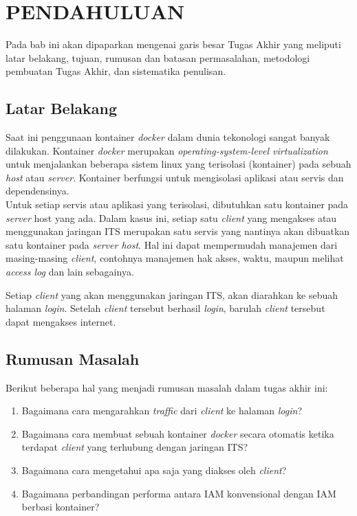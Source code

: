 \chapter{PENDAHULUAN}
  Pada bab ini akan dipaparkan mengenai garis besar Tugas Akhir yang meliputi latar belakang, tujuan, rumusan dan batasan permasalahan, metodologi pembuatan Tugas Akhir, dan sistematika penulisan.
  
  \section{Latar Belakang}
    Saat ini penggunaan kontainer \textit{docker} dalam dunia tekonologi sangat banyak dilakukan. Kontainer \textit{docker} merupakan \textit{operating-system-level virtualization} untuk menjalankan beberapa sistem linux yang terisolasi (kontainer) pada sebuah \textit{host} atau \textit{server}. Kontainer berfungsi untuk mengisolasi aplikasi atau servis dan dependensinya.\\
	\indent Untuk setiap servis atau aplikasi yang terisolasi, dibutuhkan satu kontainer pada \textit{server} host yang ada. Dalam kasus ini, setiap satu \textit{client} yang mengakses atau menggunakan jaringan ITS merupakan satu servis yang nantinya akan dibuatkan satu kontainer pada \textit{server host}. Hal ini dapat mempermudah manajemen dari masing-masing \textit{client}, contohnya manajemen hak akses, waktu, maupun melihat \textit{access log} dan lain sebagainya.
	
	Setiap \textit{client} yang akan menggunakan jaringan ITS, akan diarahkan ke sebuah halaman \textit{login}. Setelah \textit{client} tersebut berhasil \textit{login}, barulah \textit{client} tersebut dapat mengakses internet.

\section{Rumusan Masalah}
	Berikut beberapa hal yang menjadi rumusan masalah dalam tugas akhir ini:
	\begin{enumerate}
	 \item Bagaimana cara mengarahkan \textit{traffic} dari \textit{client} ke halaman \textit{login}?
	 \item Bagaimana cara membuat sebuah kontainer \textit{docker} secara otomatis ketika terdapat \textit{client} yang terhubung dengan jaringan ITS?
	 \item Bagaimana cara mengetahui apa saja yang diakses oleh \textit{client}?
	 \item Bagaimana perbandingan performa antara IAM konvensional dengan IAM berbasi kontainer?
	\end{enumerate}

